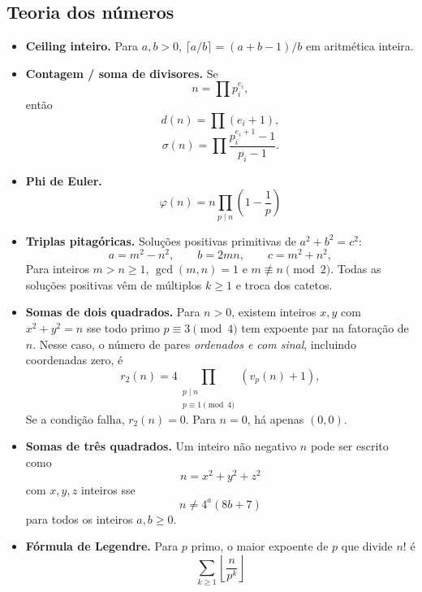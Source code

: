 \subsection{Teoria dos números}
\begin{itemize}[leftmargin=*,label={}]
\ifextended
\item \textbf{Ceiling inteiro.}
Para $a,b>0$, $\lceil a/b\rceil=(a+b-1)/b$ em aritmética inteira.
\fi

	\ifextended
	\item \textbf{Contagem / soma de divisores.}
		Se
		\[
			n=\prod p_i^{e_i},
		\]
		então
		\[
			d(n)=\prod (e_i+1),
		\]
		\[
			\sigma(n)=\prod \frac{p_i^{e_i+1}-1}{p_i-1}.
		\]
	\fi



		\ifextended
	\item \textbf{Phi de Euler.}
		\[
			\varphi(n)=n\prod_{p\mid n}\left(1-\frac1p\right)
		\]
		\fi

	\item \textbf{Triplas pitagóricas.}
		Soluções positivas primitivas de $a^2+b^2=c^2$:
		\[
			a=m^2-n^2,\qquad b=2mn,\qquad c=m^2+n^2,
		\]
		Para inteiros $m>n\ge1$, $\gcd(m,n)=1$ e $m\not\equiv n\pmod2$.
		Todas as soluções positivas vêm de múltiplos $k\ge1$ e troca dos catetos.

\item \textbf{Somas de dois quadrados.}
Para $n>0$, existem inteiros $x,y$ com $x^2+y^2=n$ sse todo primo $p\equiv3\pmod4$ tem expoente par na fatoração de $n$. Nesse caso, o número de pares \emph{ordenados e com sinal}, incluindo coordenadas zero, é
\[
r_2(n)=4\prod_{\substack{p\mid n\\p\equiv1\pmod4}}(v_p(n)+1),
\]
Se a condição falha, $r_2(n)=0$. Para $n=0$, há apenas $(0,0)$.

\item \textbf{Somas de três quadrados.}
		Um inteiro não negativo $n$ pode ser escrito como
		\[
			n=x^2+y^2+z^2
		\]
		com $x,y,z$ inteiros sse
		\[
			n\ne 4^a(8b+7)
		\]
		para todos os inteiros $a,b\ge 0$.

		\ifextended
	\item \textbf{Fórmula de Legendre.}
		Para $p$ primo, o maior expoente de $p$ que divide $n!$ é
		\[
			\sum_{k\ge1}\left\lfloor \frac{n}{p^k}\right\rfloor
		\]
		\fi


\end{itemize}
